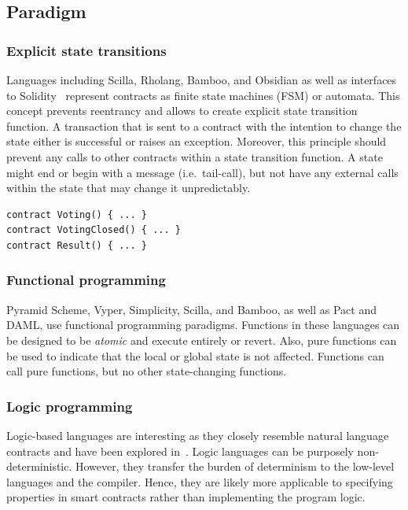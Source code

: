 \subsection{Paradigm}

\subsubsection{Explicit state transitions}
Languages including Scilla, Rholang, Bamboo, and Obsidian as well as interfaces to Solidity~\cite{Mavridou2018} represent contracts as finite state machines (FSM) or automata. This concept prevents reentrancy and allows to create explicit state transition function. A transaction that is sent to a contract with the intention to change the state either is successful or raises an exception. Moreover, this principle should prevent any calls to other contracts within a state transition function. A state might end or begin with a message (i.e.\ tail-call), but not have any external calls within the state that may change it unpredictably.

\begin{lstlisting}[caption={A separation of states represented in Bamboo, where each state represents a different contract at the same address.},label=lst:fsm,language=Solidity]
contract Voting() { ... }
contract VotingClosed() { ... }
contract Result() { ... }
\end{lstlisting}

\subsubsection{Functional programming}
Pyramid Scheme, Vyper, Simplicity, Scilla, and Bamboo, as well as Pact and DAML, use functional programming paradigms. Functions in these languages can be designed to be \emph{atomic} and execute entirely or revert. Also, pure functions can be used to indicate that the local or global state is not affected. Functions can call pure functions, but no other state-changing functions.

\subsubsection{Logic programming}
Logic-based languages are interesting as they closely resemble natural language contracts and have been explored in~\cite{Idelberger2016}. Logic languages can be purposely non-deterministic. However, they transfer the burden of determinism to the low-level languages and the compiler. Hence, they are likely more applicable to specifying properties in smart contracts rather than implementing the program logic.


